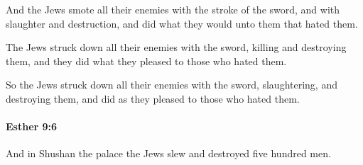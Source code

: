 			\begin{versebox}
					\item[BHS] 
					\item[ASV] And the Jews smote all their enemies with the stroke of the sword, and with slaughter and destruction, and did what they would unto them that hated them.
					\item[NIV] The Jews struck down all their enemies with the sword, killing and destroying them, and they did what they pleased to those who hated them.
					\item[NRSV] So the Jews struck down all their enemies with the sword, slaughtering, and destroying them, and did as they pleased to those who hated them.
			\end{versebox}

		\paragraph{Esther 9:6} %
			\label{ESTHER-9-6}

			And in Shushan the palace the Jews slew and destroyed five hundred men.

